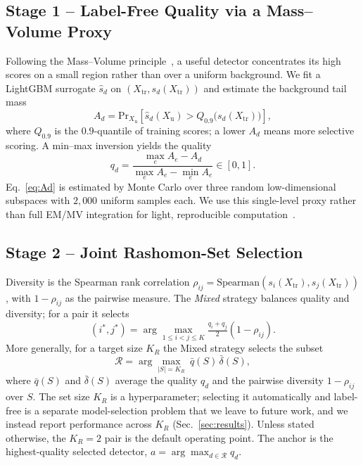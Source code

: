 \documentclass[conference]{IEEEtran}
\begin{document}
\subsection{Stage 1 -- Label-Free Quality via a Mass--Volume Proxy}
\label{sec:quality}
Following the Mass--Volume principle~\cite{Goix2016}, a useful detector
concentrates its high scores on a small region rather than over a uniform
background. We fit a LightGBM surrogate $\hat{s}_d$ on
$(X_{\mathrm{tr}},s_d(X_{\mathrm{tr}}))$ and estimate the background tail
mass
\begin{equation}
A_d=\mathrm{Pr}_{X_{\mathrm{u}}}\!\left[\hat{s}_d(X_{\mathrm{u}})>Q_{0.9}\bigl(s_d(X_{\mathrm{tr}})\bigr)\right],
\label{eq:Ad}
\end{equation}
where $Q_{0.9}$ is the $0.9$-quantile of training scores; a lower $A_d$
means more selective scoring. A min--max inversion yields the quality
\begin{equation}
q_d=\frac{\max_e A_e-A_d}{\max_e A_e-\min_e A_e}\in[0,1].
\label{eq:quality}
\end{equation}
Eq.~\eqref{eq:Ad} is estimated by Monte Carlo over three random
low-dimensional subspaces with $2{,}000$ uniform samples each. We use
this single-level proxy rather than full EM/MV integration for light,
reproducible computation~\cite{MaZhao2023}.

\subsection{Stage 2 -- Joint Rashomon-Set Selection}
\label{sec:rashomon}
Diversity is the Spearman rank correlation
$\rho_{ij}=\mathrm{Spearman}(s_i(X_{\mathrm{tr}}),s_j(X_{\mathrm{tr}}))$,
with $1-\rho_{ij}$ as the pairwise measure. The \emph{Mixed} strategy
balances quality and diversity; for a pair it selects
\begin{equation}
(i^*,j^*)=\arg\max_{1\le i<j\le K}\tfrac{q_i+q_j}{2}\left(1-\rho_{ij}\right).
\label{eq:joint-pair}
\end{equation}
More generally, for a target size $K_R$ the Mixed strategy selects the
subset
\begin{equation}
\mathcal{R}=\arg\max_{|S|=K_R}\ \bar{q}(S)\,\bar{\delta}(S),
\label{eq:rashomon-mixed}
\end{equation}
where $\bar{q}(S)$ and $\bar{\delta}(S)$ average the quality $q_d$ and the
pairwise diversity $1-\rho_{ij}$ over $S$. The set size $K_R$ is a
hyperparameter; selecting it automatically and label-free is a separate
model-selection problem that we leave to future work, and we instead
report performance across $K_R$ (Sec.~\ref{sec:results}). Unless stated
otherwise, the $K_R{=}2$ pair is the default operating point. The anchor
is the highest-quality selected detector,
$a=\arg\max_{d\in\mathcal{R}}q_d$.
\end{document}
